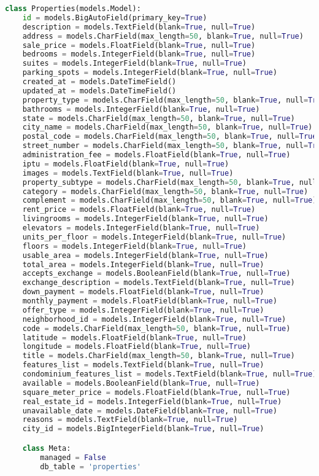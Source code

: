 \begin{apendicesenv}
\begin{lstlisting}[language=Python, caption=API - models.py]
class Properties(models.Model):
    id = models.BigAutoField(primary_key=True)
    description = models.TextField(blank=True, null=True)
    address = models.CharField(max_length=50, blank=True, null=True)
    sale_price = models.FloatField(blank=True, null=True)
    bedrooms = models.IntegerField(blank=True, null=True)
    suites = models.IntegerField(blank=True, null=True)
    parking_spots = models.IntegerField(blank=True, null=True)
    created_at = models.DateTimeField()
    updated_at = models.DateTimeField()
    property_type = models.CharField(max_length=50, blank=True, null=True)
    bathrooms = models.IntegerField(blank=True, null=True)
    state = models.CharField(max_length=50, blank=True, null=True)
    city_name = models.CharField(max_length=50, blank=True, null=True)
    postal_code = models.CharField(max_length=50, blank=True, null=True)
    street_number = models.CharField(max_length=50, blank=True, null=True)
    administration_fee = models.FloatField(blank=True, null=True)
    iptu = models.FloatField(blank=True, null=True)
    images = models.TextField(blank=True, null=True)
    property_subtype = models.CharField(max_length=50, blank=True, null=True)
    category = models.CharField(max_length=50, blank=True, null=True)
    complement = models.CharField(max_length=50, blank=True, null=True)
    rent_price = models.FloatField(blank=True, null=True)
    livingrooms = models.IntegerField(blank=True, null=True)
    elevators = models.IntegerField(blank=True, null=True)
    units_per_floor = models.IntegerField(blank=True, null=True)
    floors = models.IntegerField(blank=True, null=True)
    usable_area = models.IntegerField(blank=True, null=True)
    total_area = models.IntegerField(blank=True, null=True)
    accepts_exchange = models.BooleanField(blank=True, null=True)
    exchange_description = models.TextField(blank=True, null=True)
    down_payment = models.FloatField(blank=True, null=True)
    monthly_payment = models.FloatField(blank=True, null=True)
    offer_type = models.IntegerField(blank=True, null=True)
    neighborhood_id = models.IntegerField(blank=True, null=True)
    code = models.CharField(max_length=50, blank=True, null=True)
    latitude = models.FloatField(blank=True, null=True)
    longitude = models.FloatField(blank=True, null=True)
    title = models.CharField(max_length=50, blank=True, null=True)
    features_list = models.TextField(blank=True, null=True)
    condominium_features_list = models.TextField(blank=True, null=True)
    available = models.BooleanField(blank=True, null=True)
    square_meter_price = models.FloatField(blank=True, null=True)
    real_estate_id = models.IntegerField(blank=True, null=True)
    unavailable_date = models.DateField(blank=True, null=True)
    reasons = models.TextField(blank=True, null=True)
    city_id = models.BigIntegerField(blank=True, null=True)

    class Meta:
        managed = False
        db_table = 'properties'
\end{lstlisting}

\end{apendicesenv}
